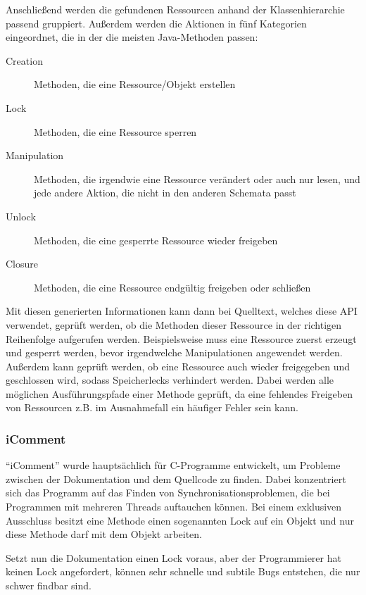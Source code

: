 Anschließend werden die gefundenen Ressourcen anhand der Klassenhierarchie passend gruppiert. Außerdem werden die Aktionen in fünf Kategorien eingeordnet, die in der die meisten Java-Methoden passen\cite[S. 311]{InferringResourceSpecificationsfromNaturalLanguageAPIDocumentation}:
\begin{description}
    \item[Creation] Methoden, die eine Ressource/Objekt erstellen
    \item[Lock] Methoden, die eine Ressource sperren
    \item[Manipulation] Methoden, die irgendwie eine Ressource verändert oder auch nur lesen, und jede andere Aktion, die nicht in den anderen Schemata passt
    \item[Unlock] Methoden, die eine gesperrte Ressource wieder freigeben
    \item[Closure] Methoden, die eine Ressource endgültig freigeben oder schließen
\end{description}

Mit diesen generierten Informationen kann dann bei Quelltext, welches diese API verwendet, geprüft werden, ob die Methoden dieser Ressource in der richtigen Reihenfolge aufgerufen werden. Beispielsweise muss eine Ressource zuerst erzeugt und gesperrt werden, bevor irgendwelche Manipulationen angewendet werden. Außerdem kann geprüft werden, ob eine Ressource auch wieder freigegeben und geschlossen wird, sodass Speicherlecks verhindert werden. Dabei werden alle möglichen Ausführungspfade einer Methode geprüft, da eine fehlendes Freigeben von Ressourcen z.B. im Ausnahmefall ein häufiger Fehler sein kann. 

\subsubsection{iComment}
\enquote{\/\*iComment} \cite[S. 145ff.]{icomment} wurde hauptsächlich für C-Programme entwickelt, um Probleme zwischen der Dokumentation und dem Quellcode zu finden. Dabei konzentriert sich das Programm auf das Finden von Synchronisationsproblemen, die bei Programmen mit mehreren Threads auftauchen können.  Bei einem exklusiven Ausschluss besitzt eine Methode einen sogenannten Lock auf ein Objekt und nur diese Methode darf mit dem Objekt arbeiten.

Setzt nun die Dokumentation einen Lock voraus, aber der Programmierer hat keinen Lock angefordert, können sehr schnelle und subtile Bugs entstehen, die nur schwer findbar sind. 

